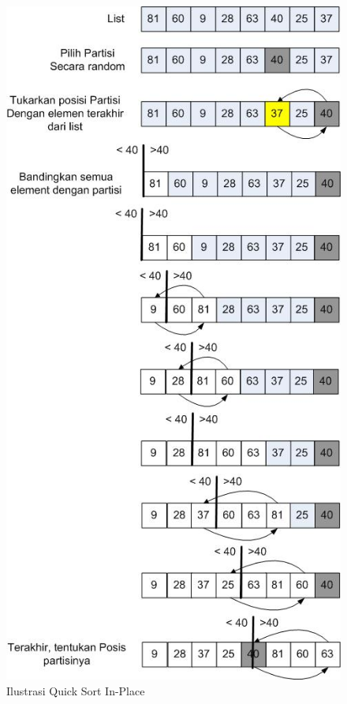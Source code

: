\documentclass[12pt]{book}%
\begin{document}
\begin{figure}[htbp]
\begin{center}
	\includegraphics[scale=0.5]{fig/sunario-3/QuickSort2.jpg}%
	\caption{Ilustrasi Quick Sort In-Place}%
	\label{fig:Quick Sort Ilustration 2}%
\end{center}
\end{figure}
\end{document}

